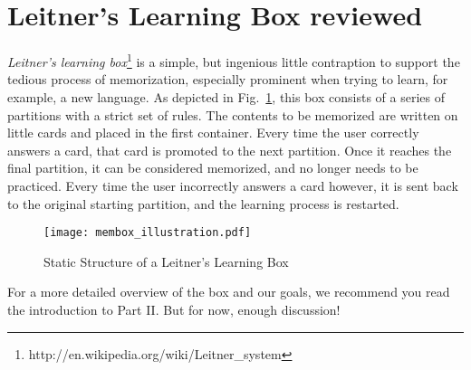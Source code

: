 \section{Leitner's Learning Box reviewed}

\emph{Leitner's learning box}\footnote{http://en.wikipedia.org/wiki/Leitner\_system} is a simple, but ingenious little contraption to support the tedious
process of memorization, especially prominent when trying to learn, for example, a new language. As depicted in Fig.~\ref{fig:membox_depiction}, this box
consists of a series of partitions with a strict set of rules. The contents to be memorized are written on little cards and placed in the first container. Every
time the user correctly answers a card, that card is promoted to the next partition. Once it reaches the final partition, it can be considered memorized, and
no longer needs to be practiced. Every time the user incorrectly answers a card however, it is sent back to the original starting partition, and the
learning process is restarted.

\begin{figure}[htbp]
	\centering
  \texttt{[image: membox\_illustration.pdf]}
	\caption{Static Structure of a Leitner's Learning Box}
	\label{fig:membox_depiction}
\end{figure}
\FloatBarrier

For a more detailed overview of the box and our goals, we recommend you read the introduction to Part II. But for now, enough discussion!


